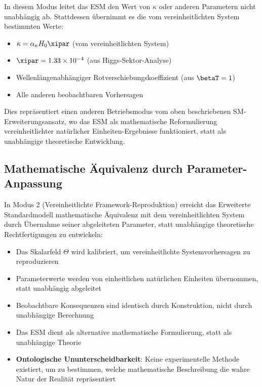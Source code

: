 	In diesem Modus leitet das ESM den Wert von $\kappa$ oder anderen Parametern nicht unabhängig ab. Stattdessen übernimmt es die vom vereinheitlichten System bestimmten Werte:
	
	\begin{itemize}
		\item $\kappa = \alpha_\kappa H_0 \xipar$ (vom vereinheitlichten System)
		\item $\xipar = 1.33 \times 10^{-4}$ (aus Higgs-Sektor-Analyse)
		\item Wellenlängenabhängiger Rotverschiebungskoeffizient (aus $\betaT = 1$)
		\item Alle anderen beobachtbaren Vorhersagen
	\end{itemize}
	
	Dies repräsentiert einen anderen Betriebsmodus vom oben beschriebenen SM-Erweiterungsansatz, wo das ESM als mathematische Reformulierung vereinheitlichter natürlicher Einheiten-Ergebnisse funktioniert, statt als unabhängige theoretische Entwicklung.
	
	\subsection{Mathematische Äquivalenz durch Parameter-Anpassung}
	\label{subsec:mathematical_equivalence_parameters}
	
	In Modus 2 (Vereinheitlichte Framework-Reproduktion) erreicht das Erweiterte Standardmodell mathematische Äquivalenz mit dem vereinheitlichten System durch Übernahme seiner abgeleiteten Parameter, statt unabhängige theoretische Rechtfertigungen zu entwickeln:
	
	\begin{itemize}
		\item Das Skalarfeld $\Theta$ wird kalibriert, um vereinheitlichte Systemvorhersagen zu reproduzieren
		\item Parameterwerte werden von einheitlichen natürlichen Einheiten übernommen, statt unabhängig abgeleitet
		\item Beobachtbare Konsequenzen sind identisch durch Konstruktion, nicht durch unabhängige Berechnung
		\item Das ESM dient als alternative mathematische Formulierung, statt als unabhängige Theorie
		\item \textbf{Ontologische Ununterscheidbarkeit}: Keine experimentelle Methode existiert, um zu bestimmen, welche mathematische Beschreibung die wahre Natur der Realität repräsentiert
	\end{itemize}
	
